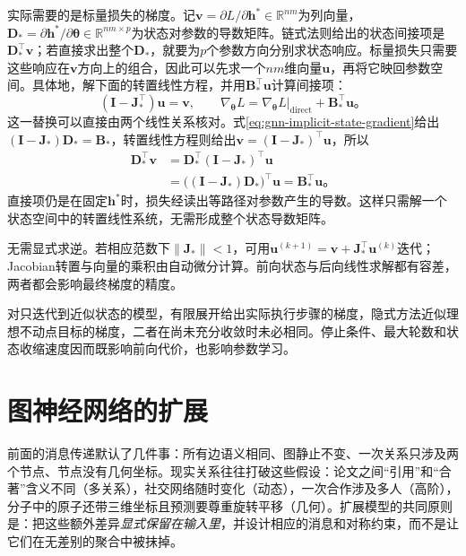 实际需要的是标量损失的梯度。记$\bm{v}=\partial L/\partial\bm{h}^*\in\mathbb{R}^{nm}$为列向量，$\bm{D}_*=\partial\bm{h}^*/\partial\bm{\theta}\in\mathbb{R}^{nm\times p}$为状态对参数的导数矩阵。链式法则给出的状态间接项是$\bm{D}_*^{\top}\bm{v}$；若直接求出整个$\bm{D}_*$，就要为$p$个参数方向分别求状态响应。标量损失只需要这些响应在$\bm{v}$方向上的组合，因此可以先求一个$nm$维向量$\bm{u}$，再将它映回参数空间。具体地，解下面的转置线性方程，并用$\bm{B}_*^{\top}\bm{u}$计算间接项：
\begin{equation}
  (\bm{I}-\bm{J}_*^{\top})\bm{u}=\bm{v},\qquad
  \nabla_{\bm{\theta}}L
    =\left.\nabla_{\bm{\theta}}L\right|_{\mathrm{direct}}+\bm{B}_*^{\top}\bm{u}\text{。}
  \label{eq:gnn-implicit-loss-gradient}
\end{equation}
这一替换可以直接由两个线性关系核对。式\eqref{eq:gnn-implicit-state-gradient}给出$(\bm{I}-\bm{J}_*)\bm{D}_*=\bm{B}_*$，转置线性方程则给出$\bm{v}=(\bm{I}-\bm{J}_*)^{\top}\bm{u}$，所以
\[
  \begin{aligned}
    \bm{D}_*^{\top}\bm{v}
      &=\bm{D}_*^{\top}(\bm{I}-\bm{J}_*)^{\top}\bm{u}\\
      &=\bigl((\bm{I}-\bm{J}_*)\bm{D}_*\bigr)^{\top}\bm{u}
       =\bm{B}_*^{\top}\bm{u}\text{。}
  \end{aligned}
\]
直接项仍是在固定$\bm{h}^*$时，损失经读出等路径对参数产生的导数。这样只需解一个状态空间中的转置线性系统，无需形成整个状态导数矩阵。

无需显式求逆。若相应范数下$\lVert\bm{J}_*\rVert<1$，可用$\bm{u}^{(k+1)}=\bm{v}+\bm{J}_*^{\top}\bm{u}^{(k)}$迭代；Jacobian转置与向量的乘积由自动微分计算。前向状态与后向线性求解都有容差，两者都会影响最终梯度的精度。

对只迭代到近似状态的模型，有限展开给出实际执行步骤的梯度，隐式方法近似理想不动点目标的梯度，二者在尚未充分收敛时未必相同。停止条件、最大轮数和状态收缩速度因而既影响前向代价，也影响参数学习。

\section{图神经网络的扩展}
\label{sec:gnn-extensions}

前面的消息传递默认了几件事：所有边语义相同、图静止不变、一次关系只涉及两个节点、节点没有几何坐标。现实关系往往打破这些假设：论文之间“引用”和“合著”含义不同（多关系），社交网络随时变化（动态），一次合作涉及多人（高阶），分子中的原子还带三维坐标且预测要尊重旋转平移（几何）。扩展模型的共同原则是：把这些额外差异\emph{显式保留在输入里}，并设计相应的消息和对称约束，而不是让它们在无差别的聚合中被抹掉。

